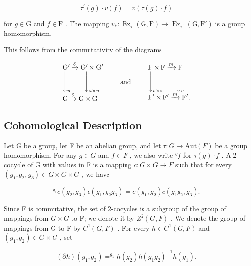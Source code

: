 \[
\tau^ {\prime} (g) \cdot v (f) = v (\tau (g) \cdot f)
\]

for \(g \in \mathrm{G}\) and \(f \in \mathrm{F}\) . The mapping \(v_{*} : \operatorname{Ex}_{\tau}(\mathrm{G}, \mathrm{F}) \to \operatorname{Ex}_{\tau'}(\mathrm{G}, \mathrm{F}')\) is a group homomorphism.

This follows from the commutativity of the diagrams

\[
\begin{array}{l} \mathrm{G} ^ {\prime} \xrightarrow {\delta} \mathrm{G} ^ {\prime} \times \mathrm{G} ^ {\prime} \\ \Biggl \downarrow_ {u} \qquad \Biggl \downarrow_ {u \times u} \\ \mathrm{G} \xrightarrow {\delta} \mathrm{G} \times \mathrm{G} \end{array} \qquad \text {and} \qquad \begin{array}{l} \mathrm{F} \times \mathrm{F} \xrightarrow {m} \mathrm{F} \\ \Biggl \downarrow_ {v \times v} \qquad \Biggl \downarrow_ {v} \\ \mathrm{F} ^ {\prime} \times \mathrm{F} ^ {\prime} \xrightarrow {m} \mathrm{F} ^ {\prime}. \end{array}
\]

\subsection{Cohomological Description}

Let G be a group, let F be an abelian group, and let \(\tau: G \to \text{Aut}(F)\) be a group homomorphism. For any \(g \in G\) and \(f \in F\) , we also write \(^{g}f\) for \(\tau(g) \cdot f\) . A 2-cocycle of G with values in F is a mapping \(c: G \times G \to F\) such that for every \((g_{1}, g_{2}, g_{3}) \in G \times G \times G\) , we have

\[
{ } ^ { g _ { 1 } } c ( g _ { 2 } , g _ { 3 } ) c ( g _ { 1 } , g _ { 2 } g _ { 3 } ) = c ( g _ { 1 } , g _ { 2 } ) c ( g _ { 1 } g _ { 2 } , g _ { 3 } ) .\tag{7}
\]

Since F is commutative, the set of 2-cocycles is a subgroup of the group of mappings from \(G \times G\) to F; we denote it by \(Z^{2}(G,F)\) . We denote the group of mappings from G to F by \(C^{1}(G,F)\) . For every \(h \in C^{1}(G,F)\) and \((g_{1}, g_{2}) \in G \times G\) , set

\[
(\partial h) (g _ {1}, g _ {2}) = ^ {g _ {1}} h (g _ {2}) h (g _ {1} g _ {2}) ^ {- 1} h (g _ {1}).\tag{8}
\]

